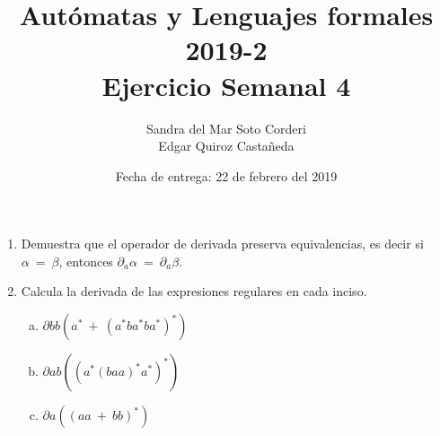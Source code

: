 \documentclass{article}
\begin{document}
    
    \title{Autómatas y Lenguajes formales 2019-2\\
    \large Ejercicio Semanal 4}

    \date{Fecha de entrega: 22 de febrero del 2019}

    \author{Sandra del Mar Soto Corderi\\
    Edgar Quiroz Castañeda}

    \maketitle


    \begin{enumerate}
        \item {
        Demuestra que el operador de derivada preserva equivalencias, es decir si
		$\alpha \ = \ \beta$, entonces $\partial_{a} \alpha \ = \ \partial_{a} \beta$.\\

            
        }
        
        \item{
        Calcula la derivada de las expresiones regulares en cada inciso.\\
		\begin{enumerate}[a)]
		
		\item{
		$\partial{bb} (a^* \ + \  (a^*ba^*ba^*)^*)$\\
		
		
		}
		
		\item{
		$\partial{ab} ((a^*(baa)^*a^*)^*)$\\
		
		
		}
		
		\item{
		$\partial{a} ((aa \  + \  bb)^*)$\\
		
		
		}		
		
		\end{enumerate}		        
        
        
        }
    \end{enumerate}
\end{document}
